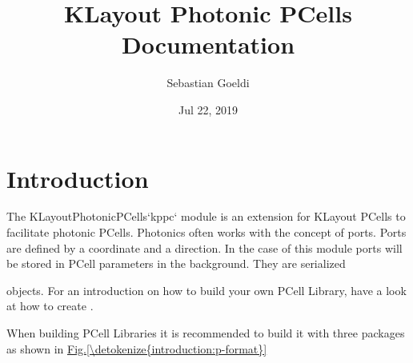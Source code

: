 \documentclass[a4paper,10pt,english]{sphinxmanual}
\title{KLayout Photonic PCells Documentation}
\date{Jul 22, 2019}
\author{Sebastian Goeldi}
\begin{document}
\pagestyle{empty}
\sphinxmaketitle
\pagestyle{plain}
\sphinxtableofcontents
\pagestyle{normal}
\label{\detokenize{index::doc}}



\chapter{Introduction}
\label{\detokenize{introduction:introduction}}\label{\detokenize{introduction::doc}}
The KLayoutPhotonicPCells{}`kppc{}` module is an extension for KLayout PCells to facilitate photonic PCells.
Photonics often works with the concept of ports.
Ports are defined by a coordinate and a direction. In the case of this module ports will be stored in PCell parameters in the background.
They are serialized %
\begin{footnote}[1]\sphinxAtStartFootnote
{}
%
\end{footnote} objects. For an introduction on how to build your own PCell Library, have a look at
how to create {\hyperref[\detokenize{photonics/example_library::doc}]{}}.

When building PCell Libraries it is recommended to build it with three packages as shown in \hyperref[\detokenize{introduction:p-format}]{Fig.\@ \ref{\detokenize{introduction:p-format}}}
\end{document}
